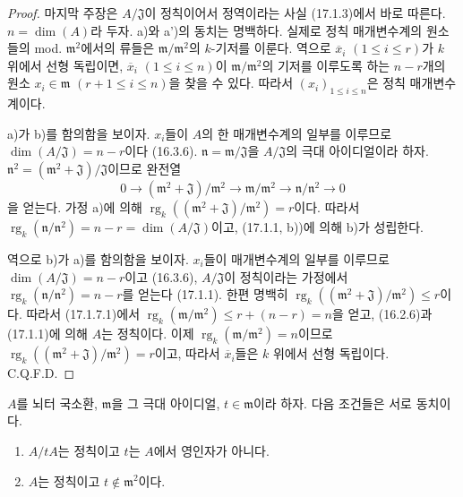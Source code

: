 \begin{proof}
마지막 주장은 $A/\mathfrak{J}$이 정칙이어서 정역이라는 사실
(17.1.3)에서 바로 따른다. $n=\dim(A)$라 두자. a)와 a')의 동치는
명백하다. 실제로 정칙 매개변수계의 원소들의 mod.
$\mathfrak{m}^2$에서의 류들은 $\mathfrak{m}/\mathfrak{m}^2$의
$k$-기저를 이룬다. 역으로 $\overline{x}_i$ $(1\leq i\leq r)$가
$k$ 위에서 선형 독립이면, $\overline{x}_i$ $(1\leq i\leq n)$이
$\mathfrak{m}/\mathfrak{m}^2$의 기저를 이루도록 하는 $n-r$개의
원소 $x_i\in\mathfrak{m}$ $(r+1\leq i\leq n)$을 찾을 수 있다.
따라서 $(x_i)_{1\leq i\leq n}$은 정칙 매개변수계이다.

a)가 b)를 함의함을 보이자. $x_i$들이 $A$의 한 매개변수계의 일부를
이루므로 $\dim(A/\mathfrak{J})=n-r$이다 (16.3.6).
$\mathfrak{n}=\mathfrak{m}/\mathfrak{J}$을 $A/\mathfrak{J}$의 극대
아이디얼이라 하자. $\mathfrak{n}^2=
(\mathfrak{m}^2+\mathfrak{J})/\mathfrak{J}$이므로 완전열
\begin{equation}
\label{0.17.1.7.1-fr}
\tag{17.1.7.1}
  0\longrightarrow(\mathfrak{m}^2+\mathfrak{J})/\mathfrak{m}^2
  \longrightarrow\mathfrak{m}/\mathfrak{m}^2
  \longrightarrow\mathfrak{n}/\mathfrak{n}^2\longrightarrow0
\end{equation}
을 얻는다. 가정 a)에 의해
$\operatorname{rg}_k((\mathfrak{m}^2+\mathfrak{J})/
\mathfrak{m}^2)=r$이다. 따라서
$\operatorname{rg}_k(\mathfrak{n}/\mathfrak{n}^2)=n-r
=\dim(A/\mathfrak{J})$이고, (17.1.1, b))에 의해 b)가 성립한다.

역으로 b)가 a)를 함의함을 보이자. $x_i$들이 매개변수계의 일부를
이루므로 $\dim(A/\mathfrak{J})=n-r$이고 (16.3.6),
$A/\mathfrak{J}$이 정칙이라는 가정에서
$\operatorname{rg}_k(\mathfrak{n}/\mathfrak{n}^2)=n-r$를 얻는다
(17.1.1). 한편 명백히
$\operatorname{rg}_k((\mathfrak{m}^2+\mathfrak{J})/
\mathfrak{m}^2)\leq r$이다. 따라서 (17.1.7.1)에서
$\operatorname{rg}_k(\mathfrak{m}/\mathfrak{m}^2)
\leq r+(n-r)=n$을 얻고, (16.2.6)과 (17.1.1)에 의해 $A$는
정칙이다. 이제
$\operatorname{rg}_k(\mathfrak{m}/\mathfrak{m}^2)=n$이므로
$\operatorname{rg}_k((\mathfrak{m}^2+\mathfrak{J})/
\mathfrak{m}^2)=r$이고, 따라서 $\overline{x}_i$들은 $k$ 위에서 선형
독립이다. C.Q.F.D.
\end{proof}


\begin{corollary}[17.1.8]
\label{0.17.1.8-fr}
$A$를 뇌터 국소환, $\mathfrak{m}$을 그 극대 아이디얼,
$t\in\mathfrak{m}$이라 하자. 다음 조건들은 서로 동치이다.
\begin{enumerate}
  \item[\rm a)] $A/tA$는 정칙이고 $t$는 $A$에서 영인자가 아니다.
  \item[\rm b)] $A$는 정칙이고 $t\notin\mathfrak{m}^2$이다.
\end{enumerate}
\end{corollary}

